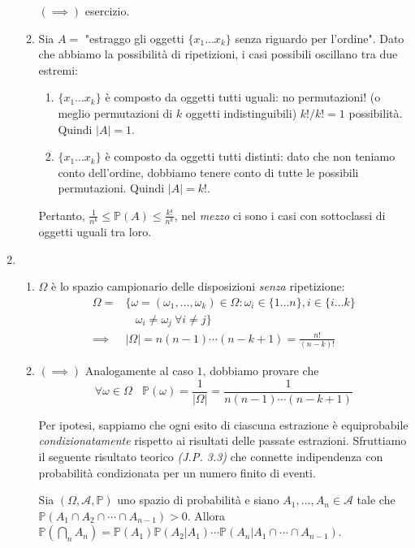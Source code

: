 \begin{enumerate}
\begin{enumerate}
$( \implies )$ esercizio.
\item Sia $A=$ "estraggo gli oggetti $\{x_{1} \dots x_{k}\}$ senza riguardo per l'ordine". Dato che abbiamo la possibilità di ripetizioni, i casi possibili oscillano tra due estremi:
\begin{enumerate}
\item $\{x_{1} \dots x_{k}\}$ è composto da oggetti tutti uguali: no permutazioni! (o meglio permutazioni di $k$ oggetti indistinguibili) $k!/k!=1$ possibilità. Quindi $| A| =1$.
\item $\{x_{1} \dots x_{k}\}$ è composto da oggetti tutti distinti: dato che non teniamo conto dell'ordine, dobbiamo tenere conto di tutte le possibili permutazioni. Quindi $| A| =k!$.
\end{enumerate}

Pertanto, $\frac{1}{n^{k}} \leq \mathbb{P}( A) \leq \frac{k!}{n^{k}}$, nel \textit{mezzo} ci sono i casi con sottoclassi di oggetti uguali tra loro.
\end{enumerate}
\item 
\begin{enumerate}
\item $\Omega $ è lo spazio campionario delle disposizioni \textit{senza} ripetizione:\begin{equation*}
\begin{aligned}
\Omega = & \{\omega =( \omega _{1} ,\dots ,\omega _{k}) \in \Omega :\omega _{i} \in \{1\dots n\} ,i\in \{i\dots k\}\\
 & \ \ \ \ \omega _{i} \neq \omega _{j} \ \forall i\neq j\}\\
\implies  & | \Omega | =n( n-1) \cdots ( n-k+1) =\frac{n!}{( n-k) !}
\end{aligned}
\end{equation*}
\item $( \implies )$ Analogamente al caso $1$, dobbiamo provare che\begin{equation*}
\forall \omega \in \Omega \ \ \ \ \mathbb{P}( \omega ) =\frac{1}{| \Omega | } =\frac{1}{n( n-1) \cdots ( n-k+1)}
\end{equation*}

Per ipotesi, sappiamo che ogni esito di ciascuna estrazione è equiprobabile \textit{condizionatamente} rispetto ai risultati delle passate estrazioni. Sfruttiamo il seguente risultato teorico \textit{(J.P. 3.3)} che connette indipendenza con probabilità condizionata per un numero finito di eventi.

Sia $( \Omega ,\mathcal{A} ,\mathbb{P})$ uno spazio di probabilità e siano $A_{1} ,\dots ,A_{n} \in \mathcal{A}$ tale che $\mathbb{P}( A_{1} \cap A_{2} \cap \cdots \cap A_{n-1})  >0$. Allora $\mathbb{P}\left(\bigcap _{n} A_{n}\right) =\mathbb{P}( A_{1})\mathbb{P}( A_{2} |A_{1}) \cdots \mathbb{P}( A_{n} |A_{1} \cap \cdots \cap A_{n-1})$.


\end{enumerate}
\end{enumerate}
